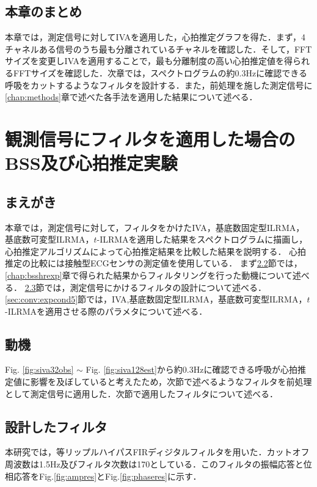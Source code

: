 \section{本章のまとめ}
本章では，測定信号に対してIVAを適用した，心拍推定グラフを得た．まず，4チャネルある信号のうち最も分離されているチャネルを確認した．そして，FFTサイズを変更しIVAを適用することで，最も分離制度の高い心拍推定値を得られるFFTサイズを確認した．次章では，スペクトログラムの約0.3Hzに確認できる呼吸をカットするようなフィルタを設計する．また，前処理を施した測定信号に\ref{chap:methods}章で述べた各手法を適用した結果について述べる．


\chapter{観測信号にフィルタを適用した場合のBSS及び心拍推定実験}
\label{chap:fbsshrexp}

\section{まえがき}
本章では，測定信号に対して，フィルタをかけたIVA，基底数固定型ILRMA，基底数可変型ILRMA，$t$-ILRMAを適用した結果をスペクトログラムに描画し，心拍推定アルゴリズムによって心拍推定結果を比較した結果を説明する．
心拍推定の比較には接触型ECGセンサの測定値を使用している．
まず\ref{sec:conv:motivation}節では，\ref{chap:bsshrexp}章で得られた結果からフィルタリングを行った動機について述べる．
\ref{sec:conv:filteroutline}節では，測定信号にかけるフィルタの設計について述べる．
\ref{sec:conv:expcond5}節では，IVA,基底数固定型ILRMA，基底数可変型ILRMA，$t$-ILRMAを適用させる際のパラメタについて述べる．

\section{動機}
\label{sec:conv:motivation}
Fig. \ref{fig:siva32obs} $\sim$ Fig. \ref{fig:siva128est}から約0.3Hzに確認できる呼吸が心拍推定値に影響を及ぼしていると考えたため，次節で述べるようなフィルタを前処理として測定信号に適用した．次節で適用したフィルタについて述べる．

\section{設計したフィルタ}
\label{sec:conv:filteroutline}
本研究では，等リップルハイパスFIRディジタルフィルタを用いた．カットオフ周波数は1.5Hz及びフィルタ次数は170としている．このフィルタの振幅応答と位相応答をFig.\ref{fig:ampres}とFig.\ref{fig:phaseres}に示す．

